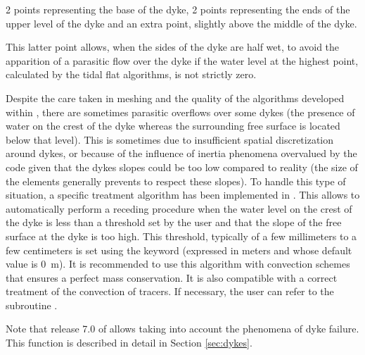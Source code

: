 2 points representing the base of the dyke, 2 points representing the ends of
the upper level of the dyke and an extra point, slightly above the middle of the dyke.


This latter point allows, when the sides of the dyke are half wet,
to avoid the apparition of a parasitic flow over the dyke if the water level at
the highest point, calculated by the tidal flat algorithms, is not strictly zero.

Despite the care taken in meshing and the quality of the algorithms developed
within , there are sometimes parasitic overflows over some dykes
(the presence of water on the crest of the dyke whereas the surrounding free
surface is located below that level).
This is sometimes due to insufficient spatial discretization around dykes,
or because of the influence of inertia phenomena overvalued by the code
given that the dykes slopes could be too low compared to reality
(the size of the elements generally prevents to respect these slopes).
To handle this type of situation, a specific treatment algorithm has been
implemented in .
This allows to automatically perform a receding procedure when the water level
on the crest of the dyke is less than a threshold set by the user
and that the slope of the free surface at the dyke is too high.
This threshold, typically of a few millimeters to a few centimeters
is set using the keyword 
(expressed in meters and whose default value is 0~m).
It is recommended to use this algorithm with convection schemes
that ensures a perfect mass conservation.
It is also compatible with a correct treatment of the convection of tracers.
If necessary, the user can refer to the subroutine .

Note that release 7.0 of  allows taking into account the phenomena
of dyke failure.
This function is described in detail in Section \ref{sec:dykes}.
